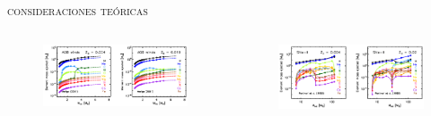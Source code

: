 \documentclass[xcolor=dvipsnames,4pt,hyperref={colorlinks,citecolor=black,linkcolor=black,urlcolor=black}]{beamer}
\begin{document}
\begin{frame}{\textsc{consideraciones teóricas}}
\begin{columns}
%
%

\begin{figure}
\includegraphics[scale=0.5]{img/yates2013-2}
\end{figure}

\begin{figure}
\includegraphics[scale=0.5]{img/yates2013-4}
\end{figure}


\end{columns}
\end{frame}
\end{document}

